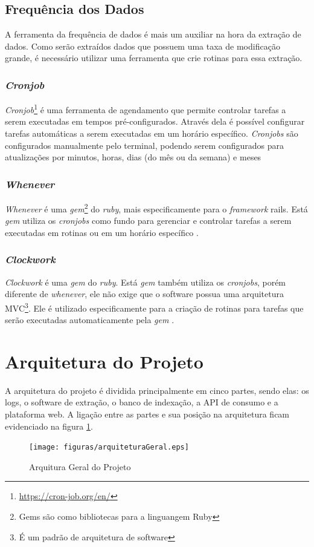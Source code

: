 \subsection{Frequência dos Dados}
A ferramenta da frequência de dados é mais um auxiliar na hora da extração de dados. Como serão extraídos dados que possuem uma taxa de modificação grande, é necessário utilizar uma ferramenta que crie rotinas para essa extração.
\subsubsection*{\textit{Cronjob}}
\textit{Cronjob}\footnote[4]{\url{https://cron-job.org/en/}} é uma ferramenta de agendamento que permite controlar tarefas a serem executadas em tempos pré-configurados. Através dela é possível configurar tarefas automáticas a serem executadas em um horário específico. \textit{Cronjobs} são configurados manualmente pelo terminal, podendo serem configurados para atualizações por minutos, horas, dias (do mês ou da semana) e meses
\subsubsection*{\textit{Whenever}}
\textit{Whenever} é uma \textit{gem}\footnote[5]{Gems são como bibliotecas para a linguangem Ruby} do \textit{ruby}, mais especificamente para o \textit{framework} rails. Está \textit{gem} utiliza os \textit{cronjobs} como fundo para gerenciar e controlar tarefas a serem executadas em rotinas ou em um horário específico \cite{whenever}.
\subsubsection*{\textit{Clockwork}}
\textit{Clockwork} é uma \textit{gem} do \textit{ruby}. Está \textit{gem} também utiliza os \textit{cronjobs}, porém diferente de \textit{whenever}, ele não exige que o software possua uma arquitetura MVC\footnote[6]{É um padrão de arquitetura de software}. Ele é utilizado especificamente para a criação de rotinas para tarefas que serão executadas automaticamente pela \textit{gem} \cite{clockwork}.
\section{Arquitetura do Projeto}
A arquitetura do projeto é dividida principalmente em cinco partes, sendo elas: os logs, o software de extração, o banco de indexação, a API de consumo e a plataforma web. A ligação entre as partes e sua posição na arquitetura ficam evidenciado na figura \ref{image:arquitetura}.
\begin{figure}
\centering
\texttt{[image: figuras/arquiteturaGeral.eps]}
\caption{Arquitura Geral do Projeto}
\label{image:arquitetura}
\end{figure}
